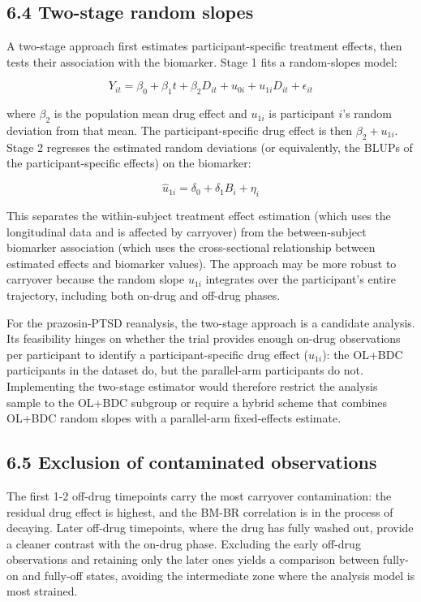 \documentclass[
]{article}
\begin{document}
\subsection{6.4 Two-stage random slopes}

A two-stage approach first estimates participant-specific
treatment effects, then tests their association with the
biomarker. Stage 1 fits a random-slopes model:

\[Y_{it} = \beta_0 + \beta_1 t + \beta_2 D_{it} + u_{0i} +
u_{1i} D_{it} + \epsilon_{it}\]

where \(\beta_2\) is the population mean drug effect and \(u_{1i}\)
is participant \(i\)'s random deviation from that mean. The
participant-specific drug effect is then \(\beta_2 + u_{1i}\).
Stage 2 regresses the estimated random deviations (or
equivalently, the BLUPs of the participant-specific effects) on
the biomarker:

\[\hat{u}_{1i} = \delta_0 + \delta_1 B_i + \eta_i\]

This separates the within-subject treatment effect estimation
(which uses the longitudinal data and is affected by carryover)
from the between-subject biomarker association (which uses the
cross-sectional relationship between estimated effects and
biomarker values). The approach may be more robust to carryover
because the random slope \(u_{1i}\) integrates over the
participant's entire trajectory, including both on-drug and
off-drug phases.

\textcolor{addblue}{For the prazosin-PTSD reanalysis, the two-stage approach is a candidate analysis. Its feasibility hinges on whether the trial provides enough on-drug observations per participant to identify a participant-specific drug effect ($u_{1i}$): the OL+BDC participants in the dataset do, but the parallel-arm participants do not. Implementing the two-stage estimator would therefore restrict the analysis sample to the OL+BDC subgroup or require a hybrid scheme that combines OL+BDC random slopes with a parallel-arm fixed-effects estimate.}

\subsection{6.5 Exclusion of contaminated observations}

The first 1-2 off-drug timepoints carry the most carryover
contamination: the residual drug effect is highest, and the
BM-BR correlation is in the process of decaying. Later off-drug
timepoints, where the drug has fully washed out, provide a
cleaner contrast with the on-drug phase. Excluding the early
off-drug observations and retaining only the later ones yields
a comparison between fully-on and fully-off states, avoiding the
intermediate zone where the analysis model is most strained.
\end{document}

